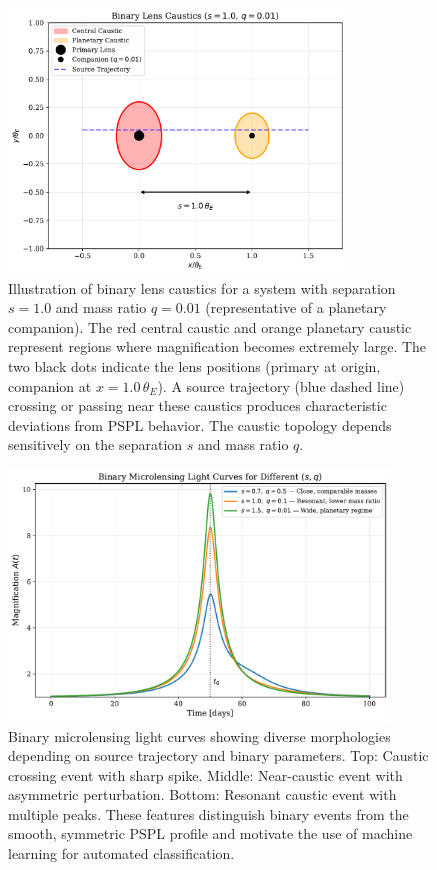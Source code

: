 \begin{figure}[htbp]
    \centering
    \includegraphics[width=0.8\textwidth]{figures/fig_binary_caustics.pdf}
    \caption[Binary lens caustic structure.]{Illustration of binary lens caustics for a system with separation $s = 1.0$ and mass ratio $q = 0.01$ (representative of a planetary companion). The red central caustic and orange planetary caustic represent regions where magnification becomes extremely large. The two black dots indicate the lens positions (primary at origin, companion at $x = 1.0\,\theta_E$). A source trajectory (blue dashed line) crossing or passing near these caustics produces characteristic deviations from PSPL behavior. The caustic topology depends sensitively on the separation $s$ and mass ratio $q$.}
    \label{fig:binary_caustics}
\end{figure}

\begin{figure}[htbp]
    \centering
    \includegraphics[width=0.9\textwidth]{figures/fig_binary_lightcurves.pdf}
    \caption[Examples of binary microlensing light curves.]{Binary microlensing light curves showing diverse morphologies depending on source trajectory and binary parameters. Top: Caustic crossing event with sharp spike. Middle: Near-caustic event with asymmetric perturbation. Bottom: Resonant caustic event with multiple peaks. These features distinguish binary events from the smooth, symmetric PSPL profile and motivate the use of machine learning for automated classification.}
    \label{fig:binary_lightcurves}
\end{figure}

